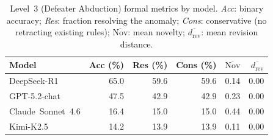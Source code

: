 \begin{table}[t]
  \centering
  \caption{Level~3 (Defeater Abduction) formal metrics by model.
           \emph{Acc}: binary accuracy;
           \emph{Res}: fraction resolving the anomaly;
           \emph{Cons}: conservative (no retracting existing rules);
           $\overline{\mathrm{Nov}}$: mean novelty;
           $\overline{d_\text{rev}}$: mean revision distance.}
  \label{tab:level3_metrics}
  \begin{tabular}{lrrrrr}
    \toprule
    Model & Acc (\%) & Res (\%) & Cons (\%) & $\overline{\mathrm{Nov}}$ & $\overline{d_\text{rev}}$ \\
    \midrule
    DeepSeek-R1 & 65.0 & 59.6 & 59.6 & 0.14 & 0.00 \\
    GPT-5.2-chat & 47.5 & 42.9 & 42.9 & 0.23 & 0.00 \\
    Claude~Sonnet~4.6 & 16.4 & 15.0 & 15.0 & 0.44 & 0.00 \\
    Kimi-K2.5 & 14.2 & 13.9 & 13.9 & 0.11 & 0.00 \\
    \bottomrule
  \end{tabular}
\end{table}
